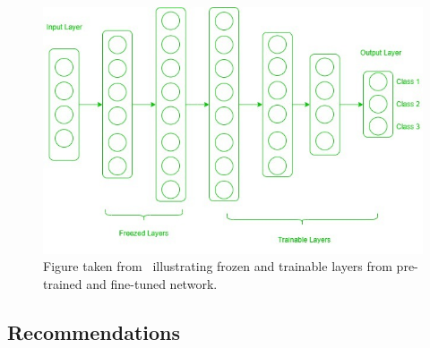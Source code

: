 \documentclass[11pt]{article}
\begin{document}
\begin{figure}[H]
    \centering
    \includegraphics[width=0.7\linewidth]{images/Frozen-layers.jpg}
    \caption{Figure taken from~\cite{geeks-transfer-learning} illustrating frozen and trainable layers from pre-trained and fine-tuned network.}
    \label{fig:frozen-layers}
\end{figure}

\subsection{Recommendations}
\end{document}
